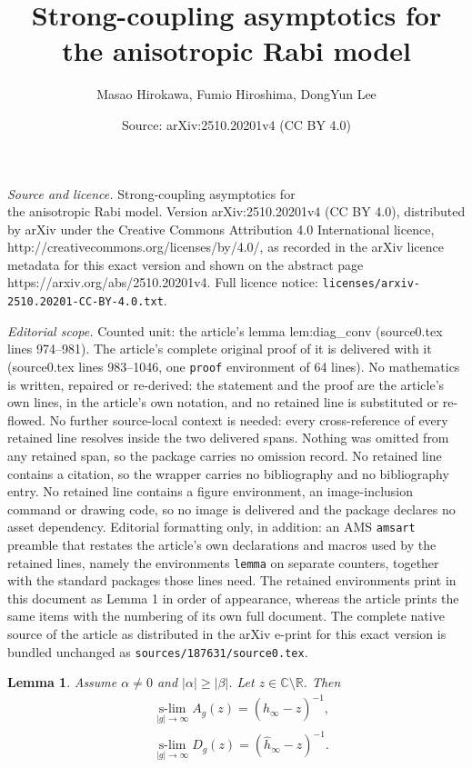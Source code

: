 \documentclass[10pt,a4paper]{amsart}
\title{\sc Strong-coupling asymptotics for \\ the anisotropic Rabi model}
\author{Masao Hirokawa, Fumio Hiroshima, DongYun Lee}
\date{Source: arXiv:2510.20201v4 (CC BY 4.0)}
\newtheorem{lemma}{Lemma}
\newcommand{\CC}{\mathbb{C}}
\newcommand{\RR}{\mathbb{R}}
\begin{document}
\maketitle

\noindent\emph{Source and licence.} \sc Strong-coupling asymptotics for \\ the anisotropic Rabi model. Version arXiv:2510.20201v4 (CC BY 4.0), distributed by arXiv under the Creative Commons Attribution 4.0 International licence, http://creativecommons.org/licenses/by/4.0/, as recorded in the arXiv licence metadata for this exact version and shown on the abstract page https://arxiv.org/abs/2510.20201v4. Full licence notice: \texttt{licenses/arxiv-2510.20201-CC-BY-4.0.txt}.\par\smallskip

\noindent\textit{Editorial scope.} Counted unit: the article's lemma lem:diag\_conv (source0.tex lines 974--981). The article's complete original proof of it is delivered with it (source0.tex lines 983--1046, one \texttt{proof} environment of 64 lines). No mathematics is written, repaired or re-derived: the statement and the proof are the article's own lines, in the article's own notation, and no retained line is substituted or re-flowed.  No further source-local context is needed: every cross-reference of every retained line resolves inside the two delivered spans.  Nothing was omitted from any retained span, so the package carries no omission record.  No retained line contains a citation, so the wrapper carries no bibliography and no bibliography entry.  No retained line contains a figure environment, an image-inclusion command or drawing code, so no image is delivered and the package declares no asset dependency.  Editorial formatting only, in addition: an AMS \texttt{amsart} preamble that restates the article's own declarations and macros used by the retained lines, namely the environments \texttt{lemma} on separate counters, together with the standard packages those lines need.  The retained environments print in this document as Lemma 1 in order of appearance, whereas the article prints the same items with the numbering of its own full document.  The complete native source of the article as distributed in the arXiv e-print for this exact version is bundled unchanged as \texttt{sources/187631/source0.tex}.
\begin{lemma}\label{lem:diag_conv}
Assume $\alpha\ne0$ and $|\alpha|\ge|\beta|$. Let $z\in\CC\setminus\RR$. 
Then 
\begin{align*}
&\operatorname*{s-lim}_{|g|\to\infty} A_g(z)=(\hat{h}_\infty-z)^{-1},\\
&\operatorname*{s-lim}_{|g|\to\infty} D_g(z)=(\hat{h}_\infty-z)^{-1}.
\end{align*}
\end{lemma}
\end{document}
